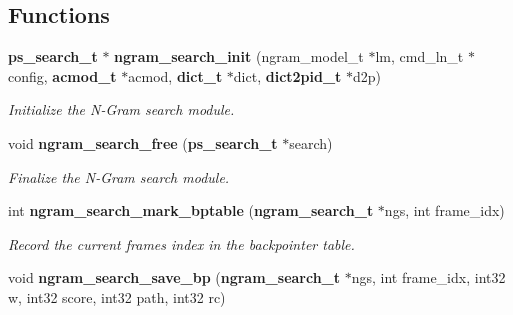 \subsection*{Functions}
\begin{DoxyCompactItemize}
\item 
{\bf ps\+\_\+search\+\_\+t} $\ast$ {\bf ngram\+\_\+search\+\_\+init} (ngram\+\_\+model\+\_\+t $\ast$lm, cmd\+\_\+ln\+\_\+t $\ast$config, {\bf acmod\+\_\+t} $\ast$acmod, {\bf dict\+\_\+t} $\ast$dict, {\bf dict2pid\+\_\+t} $\ast$d2p)\label{ngram__search_8c_a1db74b6837f13db06470649d3ae84e80}

\begin{DoxyCompactList}\small\item\em Initialize the N-\/\+Gram search module. \end{DoxyCompactList}\item 
void {\bf ngram\+\_\+search\+\_\+free} ({\bf ps\+\_\+search\+\_\+t} $\ast$search)\label{ngram__search_8c_aeaf140dc2bbeaa5c274f73480b5328f3}

\begin{DoxyCompactList}\small\item\em Finalize the N-\/\+Gram search module. \end{DoxyCompactList}\item 
int {\bf ngram\+\_\+search\+\_\+mark\+\_\+bptable} ({\bf ngram\+\_\+search\+\_\+t} $\ast$ngs, int frame\+\_\+idx)
\begin{DoxyCompactList}\small\item\em Record the current frame\textquotesingle{}s index in the backpointer table. \end{DoxyCompactList}\item 
void {\bf ngram\+\_\+search\+\_\+save\+\_\+bp} ({\bf ngram\+\_\+search\+\_\+t} $\ast$ngs, int frame\+\_\+idx, int32 w, int32 score, int32 path, int32 rc)\label{ngram__search_8c_ae36649be6f5a2190e759e7ed13bd7b6b}


\end{DoxyCompactItemize}
